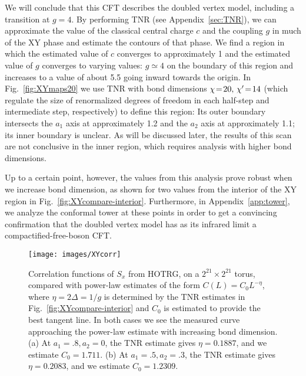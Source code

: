 \documentclass[aps,prb,letterpaper,superscriptaddress,twocolumn,showpacs,floatfix,10pt]{revtex4-1}
\begin{document}
We will conclude that this CFT describes the doubled vertex model, including a
transition at $g=4$. By performing TNR (see Appendix~\ref{sec:TNR}), we can
approximate the value of the classical central charge $c$ and the coupling $g$
in much of the XY phase and estimate
the contours of that phase. We find a region in which the
estimated value of $c$ converges to approximately 1 and the estimated value of
$g$ converges to varying values: $g \simeq 4$ on the boundary of this region
and increases to a value of about 5.5 going inward towards the origin.
In Fig.~\ref{fig:XYmaps20} we use TNR with bond dimensions 
$\chi\nobreak\!=\nobreak\!20, \,\chi'\nobreak\!=\nobreak\!14$ (which regulate
the size of renormalized degrees of freedom in each half-step and intermediate
step, respectively) to define this region:
Its outer boundary intersects the $a_1$ axis at approximately 1.2 and the
$a_2$ axis at approximately 1.1; its inner boundary is unclear. As
will be discussed later, the results of this scan are not conclusive in the
inner region, which requires analysis with higher bond dimensions.

Up to a certain point, however, the values from this analysis prove robust when
we increase bond dimension, as shown for two values from the interior of the XY
region in Fig.~\ref{fig:XYcompare-interior}. Furthermore, in
Appendix~\ref{app:tower}, we analyze the conformal tower at these points
in order to get a convincing confirmation that the doubled vertex model
has as its infrared limit a compactified-free-boson CFT.

\begin{figure}[h!]
\texttt{[image: images/XYcorr]}
\caption{Correlation functions of $S_x$ from HOTRG, on a $2^{21}\times 2^{21}$
torus, compared with power-law
estimates of the form $C(L) = C_0L^{-\eta}$, where $\eta=2\Delta=1/g$ is
determined by the TNR estimates in Fig.~\ref{fig:XYcompare-interior} and
$C_0$ is estimated to provide the best tangent line. In both cases
we see the measured curve approaching the power-law estimate with
increasing bond dimension. (a) At $a_1=.8,a_2=0$, the TNR estimate
gives $\eta=0.1887$, and we estimate $C_0=1.711$. (b) At $a_1=.5,a_2=.3$, the
TNR estimate gives $\eta=0.2083$, and we estimate $C_0=1.2309$.}
\label{fig:XYcorr}
\end{figure}
\end{document}
